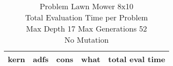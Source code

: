 \begin{table}[H]
\caption{Problem  Lawn Mower 8x10\\Total Evaluation Time per Problem \\ Max Depth 17 Max Generations 52\\ No Mutation \\}
\begin{center}
\scalebox{1.0} %
{
\begin{tabular}{llllr}
\hline
kern & adfs & cons & what & total eval time \\
\hline


\end{tabular}
}
\end{center}
\end{table}


